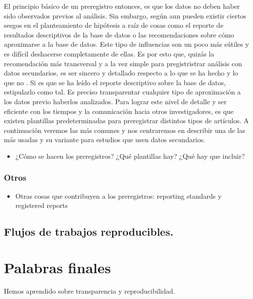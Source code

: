 \documentclass[
]{book}
\providecommand{\tightlist}{%
  \setlength{\itemsep}{0pt}\setlength{\parskip}{0pt}}
\begin{document}
El principio básico de un preregistro entonces, es que los datos no deben haber sido observados previos al análisis. Sin embargo, según \citet{nosek_preregistration_2018} aun pueden existir ciertos sesgos en el planteamiento de hipótesis a raíz de cosas como el reporte de resultados descriptivos de la base de datos o las recomendaciones sobre cómo aproximarse a la base de datos. Este tipo de influencias son un poco más sútiles y es difícil deshacerse completamente de ellas. Es por esto que, quizás la recomendación más transversal y a la vez simple para pregistristrar análisis con datos secundarios, es ser sincero y detallado respecto a lo que se ha hecho y lo que no \citep[@][]{nosek_preregistration_2018}. Si es que se ha leído el reporte descriptivo sobre la base de datos, estipularlo como tal. Es preciso transparentar cualquier tipo de aproximación a los datos previo haberlos analizados. Para lograr este nivel de detalle y ser eficiente con los tiempos y la comunicación hacia otros investigadores, es que existen plantillas predeterminadas para preregistrar distintos tipos de artículos. A continuación veremos las más comunes y nos centraremos en describir una de las más usadas y su variante para estudios que usen datos secundarios.

\begin{itemize}
\tightlist
\item
  ¿Cómo se hacen los preregistros? ¿Qué plantillas hay? ¿Qué hay que incluir?
\end{itemize}

\hypertarget{otros}{%
\subsection{Otros}\label{otros}}

\begin{itemize}
\tightlist
\item
  Otras cosas que contribuyen a los preregistros: reporting standards y registered reports
\end{itemize}

\hypertarget{flujos-de-trabajos-reproducibles.}{%
\section{Flujos de trabajos reproducibles.}\label{flujos-de-trabajos-reproducibles.}}

\hypertarget{palabras-finales}{%
\chapter{Palabras finales}\label{palabras-finales}}

Hemos aprendido sobre transparencia y reproducibilidad.

  
\end{document}

